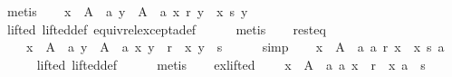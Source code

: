 \begin{isabellebody}
\ metis\isanewline
\ \ \isamarkupfalse%
\ {\isachardoublequoteopen}{\isasymforall}x\ {\isasymin}\ A\ {\isacharminus}{\kern0pt}\ {\isacharbraceleft}{\kern0pt}a{\isacharbraceright}{\kern0pt}{\isachardot}{\kern0pt}\ {\isasymforall}y\ {\isasymin}\ A\ {\isacharminus}{\kern0pt}\ {\isacharbraceleft}{\kern0pt}a{\isacharbraceright}{\kern0pt}{\isachardot}{\kern0pt}\ x\ {\isasympreceq}\isactrlsub r\ y\ {\isasymlongleftrightarrow}\ x\ {\isasympreceq}\isactrlsub s\ y{\isachardoublequoteclose}\isanewline
\ \ \ \ \isamarkupfalse%
\ lifted\ lifted{\isacharunderscore}{\kern0pt}def\ equiv{\isacharunderscore}{\kern0pt}rel{\isacharunderscore}{\kern0pt}except{\isacharunderscore}{\kern0pt}a{\isacharunderscore}{\kern0pt}def\isanewline
\ \ \ \ \isamarkupfalse%
\ metis\isanewline
\ \ \isamarkupfalse%
\ rest{\isacharunderscore}{\kern0pt}eq{\isacharcolon}{\kern0pt}\isanewline
\ \ \ \ {\isachardoublequoteopen}{\isasymforall}x\ {\isasymin}\ A\ {\isacharminus}{\kern0pt}\ {\isacharbraceleft}{\kern0pt}a{\isacharbraceright}{\kern0pt}{\isachardot}{\kern0pt}\ {\isasymforall}y\ {\isasymin}\ A\ {\isacharminus}{\kern0pt}\ {\isacharbraceleft}{\kern0pt}a{\isacharbraceright}{\kern0pt}{\isachardot}{\kern0pt}\ {\isacharparenleft}{\kern0pt}x{\isacharcomma}{\kern0pt}\ y{\isacharparenright}{\kern0pt}\ {\isasymin}\ r\ {\isasymlongleftrightarrow}\ {\isacharparenleft}{\kern0pt}x{\isacharcomma}{\kern0pt}\ y{\isacharparenright}{\kern0pt}\ {\isasymin}\ s{\isachardoublequoteclose}\isanewline
\ \ \ \ \isamarkupfalse%
\ simp\isanewline
\ \ \isamarkupfalse%
\ {\isachardoublequoteopen}{\isasymexists}x\ {\isasymin}\ A\ {\isacharminus}{\kern0pt}\ {\isacharbraceleft}{\kern0pt}a{\isacharbraceright}{\kern0pt}{\isachardot}{\kern0pt}\ a\ {\isasympreceq}\isactrlsub r\ x\ {\isasymand}\ x\ {\isasympreceq}\isactrlsub s\ a{\isachardoublequoteclose}\isanewline
\ \ \ \ \isamarkupfalse%
\ lifted\ lifted{\isacharunderscore}{\kern0pt}def\isanewline
\ \ \ \ \isamarkupfalse%
\ metis\isanewline
\ \ \isamarkupfalse%
\ ex{\isacharunderscore}{\kern0pt}lifted{\isacharcolon}{\kern0pt}\isanewline
\ \ \ \ {\isachardoublequoteopen}{\isasymexists}x\ {\isasymin}\ A\ {\isacharminus}{\kern0pt}\ {\isacharbraceleft}{\kern0pt}a{\isacharbraceright}{\kern0pt}{\isachardot}{\kern0pt}\ {\isacharparenleft}{\kern0pt}a{\isacharcomma}{\kern0pt}\ x{\isacharparenright}{\kern0pt}\ {\isasymin}\ r\ {\isasymand}\ {\isacharparenleft}{\kern0pt}x{\isacharcomma}{\kern0pt}\ a{\isacharparenright}{\kern0pt}\ {\isasymin}\ s{\isachardoublequoteclose}\isanewline

\end{isabellebody}
